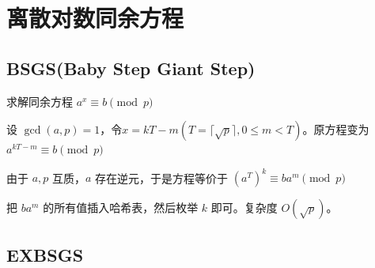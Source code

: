 \section{离散对数同余方程}
\subsection{BSGS(Baby Step Giant Step)}
\par \noindent 求解同余方程 $a^x \equiv b \pmod p$
~\\
\par \noindent 设 $\gcd(a, p) = 1$，令$x = kT - m(T = \lceil \sqrt{p} \rceil, 0 \leq m < T)$。原方程变为 $a^{kT - m} \equiv b \pmod p$
~\\
\par \noindent 由于 $a, p$ 互质，$a$ 存在逆元，于是方程等价于 $(a^T)^{k} \equiv ba^m \pmod p$ 
~\\
\par \noindent 把 $ba^m$ 的所有值插入哈希表，然后枚举 $k$ 即可。复杂度 $O(\sqrt p)$。
\subsection{EXBSGS}

